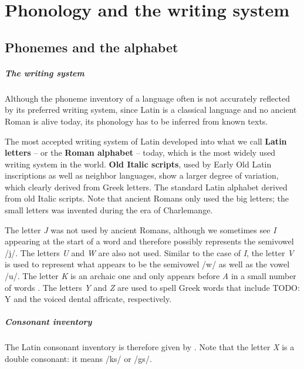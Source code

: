 \documentclass[a4paper, oneside, 12pt]{report}
\newcommand*{\citechap}[1]{chap.~{#1}}
\newcommand*{\citetable}[1]{Table~{#1}}
\newcommand*{\concept}[1]{\textbf{#1}}
\newcommand{\form}[1]{\emph{#1}}
\begin{document}
\chapter{Phonology and the writing system}

\section{Phonemes and the alphabet}

\paragraph*{The writing system}
Although the phoneme inventory of a language 
often is not accurately reflected by its preferred writing system, 
since Latin is a classical language 
and no ancient Roman is alive today, 
its phonology has to be inferred from known texts. 

The most accepted writing system of Latin developed into 
what we call \concept{Latin letters} -- or the \concept{Roman alphabet} -- today, 
which is the most widely used writing system in the world.
\concept{Old Italic scripts},
used by Early Old Latin inscriptions 
as well as neighbor languages,
show a larger degree of variation, 
which clearly derived from Greek letters.
The standard Latin alphabet derived from old Italic scripts.
Note that ancient Romans only used the big letters;
the small letters was invented during the era of Charlemange.

The letter \form{J} was not used by ancient Romans, 
although we sometimes see \form{I} appearing at the start of a word 
and therefore possibly represents the semivowel /j/.
The letters \form{U} and \form{W} are also not used.
Similar to the case of \form{I},
the letter \form{V} is used to represent 
what appears to be the semivowel /w/ 
as well as the vowel /u/. 
The letter \form{K} is an archaic one 
and only appears before \form{A} in a small number of words
\citep[\citechap{2}]{oniga2014latin}.
The letters \form{Y} and \form{Z} are used to spell Greek words that 
include TODO: Y and the voiced dental affricate, respectively.

\paragraph*{Consonant inventory}
The Latin consonant inventory is therefore given by \citet[\citetable{3.1}]{oniga2014latin}.
Note that the letter \form{X} is a double consonant: 
it means /ks/ or /gs/.
\end{document}
